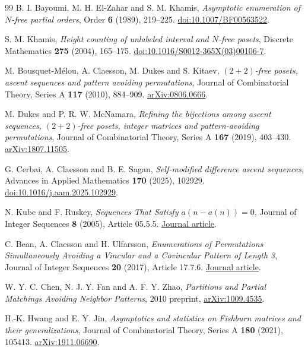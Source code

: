 \begin{thebibliography}{99}
B. I. Bayoumi, M. H. El-Zahar and S. M. Khamis,
\emph{Asymptotic enumeration of $N$-free partial orders},
Order \textbf{6} (1989), 219--225.
\href{https://doi.org/10.1007/BF00563522}{doi:10.1007/BF00563522}.

S. M. Khamis, \emph{Height counting of unlabeled interval and $N$-free posets},
Discrete Mathematics \textbf{275} (2004), 165--175.
\href{https://doi.org/10.1016/S0012-365X(03)00106-7}{doi:10.1016/S0012-365X(03)00106-7}.

M. Bousquet-M\'elou, A. Claesson, M. Dukes and S. Kitaev,
\emph{$(2+2)$-free posets, ascent sequences and pattern avoiding permutations},
Journal of Combinatorial Theory, Series A \textbf{117} (2010), 884--909.
\href{https://arxiv.org/abs/0806.0666}{arXiv:0806.0666}.

M. Dukes and P. R. W. McNamara,
\emph{Refining the bijections among ascent sequences, $(2+2)$-free posets, integer matrices and pattern-avoiding permutations},
Journal of Combinatorial Theory, Series A \textbf{167} (2019), 403--430.
\href{https://arxiv.org/abs/1807.11505}{arXiv:1807.11505}.

G. Cerbai, A. Claesson and B. E. Sagan,
\emph{Self-modified difference ascent sequences},
Advances in Applied Mathematics \textbf{170} (2025), 102929.
\href{https://doi.org/10.1016/j.aam.2025.102929}{doi:10.1016/j.aam.2025.102929}.

N. Kube and F. Ruskey,
\emph{Sequences That Satisfy $a(n-a(n))=0$},
Journal of Integer Sequences \textbf{8} (2005), Article 05.5.5.
\href{https://cs.uwaterloo.ca/journals/JIS/VOL8/Ruskey/ruskey99.html}{Journal article}.

C. Bean, A. Claesson and H. Ulfarsson,
\emph{Enumerations of Permutations Simultaneously Avoiding a Vincular and a Covincular Pattern of Length 3},
Journal of Integer Sequences \textbf{20} (2017), Article 17.7.6.
\href{https://cs.uwaterloo.ca/journals/JIS/VOL20/Bean/bean2.html}{Journal article}.

W. Y. C. Chen, N. J. Y. Fan and A. F. Y. Zhao,
\emph{Partitions and Partial Matchings Avoiding Neighbor Patterns},
2010 preprint, \href{https://arxiv.org/abs/1009.4535}{arXiv:1009.4535}.

H.-K. Hwang and E. Y. Jin,
\emph{Asymptotics and statistics on Fishburn matrices and their generalizations},
Journal of Combinatorial Theory, Series A \textbf{180} (2021), 105413.
\href{https://arxiv.org/abs/1911.06690}{arXiv:1911.06690}.


\end{thebibliography}
